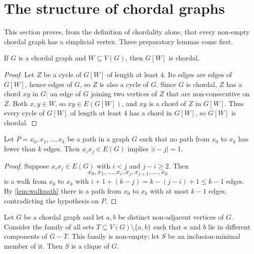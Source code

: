 \documentclass[11pt]{article}
\numberwithin{equation}{section}
\theoremstyle{plain}
\newcommand{\V}{V}
\begin{document}
\section{The structure of chordal graphs}
\label{sec:chordalstructure}

This section proves, from the definition of chordality alone, that every non-empty
chordal graph has a simplicial vertex. Three preparatory lemmas come first.

\begin{lemma}[Heredity]\label{lem:heredity}
If $G$ is a chordal graph and $W\subseteq\V(G)$, then $G[W]$ is chordal.
\end{lemma}

\begin{proof}
Let $Z$ be a cycle of $G[W]$ of length at least $4$. Its edges are edges of $G[W]$,
hence edges of $G$, so $Z$ is also a cycle of $G$. Since $G$ is chordal, $Z$ has a chord
$xy$ in $G$: an edge of $G$ joining two vertices of $Z$ that are non-consecutive on $Z$.
Both $x,y\in W$, so $xy\in E(G[W])$, and $xy$ is a chord of $Z$ in $G[W]$. Thus every
cycle of $G[W]$ of length at least $4$ has a chord in $G[W]$, so $G[W]$ is chordal.
\end{proof}

\begin{lemma}\label{lem:shortinduced}
Let $P=x_0,x_1,\dots,x_k$ be a path in a graph $G$ such that no path from $x_0$ to $x_k$
has fewer than $k$ edges. Then $x_ix_j\in E(G)$ implies $|i-j|=1$.
\end{lemma}

\begin{proof}
Suppose $x_ix_j\in E(G)$ with $i<j$ and $j-i\ge 2$. Then
\[
  x_0,x_1,\dots,x_i,x_j,x_{j+1},\dots,x_k
\]
is a walk from $x_0$ to $x_k$ with $i+1+(k-j)=k-(j-i)+1\le k-1$ edges. By
\cref{lem:walkpath} there is a path from $x_0$ to $x_k$ with at most $k-1$ edges,
contradicting the hypothesis on $P$.
\end{proof}

\begin{lemma}\label{lem:sepclique}
Let $G$ be a chordal graph and let $a,b$ be distinct non-adjacent vertices of $G$.
Consider the family of all sets $T\subseteq\V(G)\setminus\{a,b\}$ such that $a$ and $b$
lie in different components of $G-T$. This family is non-empty; let $S$ be an
inclusion-minimal member of it. Then $S$ is a clique of $G$.
\end{lemma}
\end{document}
